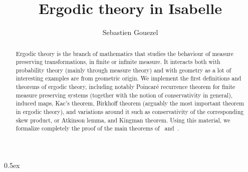 \documentclass[11pt,a4paper]{article}
\begin{document}
\title{Ergodic theory in Isabelle}
\author{Sebastien Gouezel}
\date{}
\maketitle

\begin{abstract}
Ergodic theory is the branch of mathematics that studies the behaviour of
measure preserving transformations, in finite or infinite measure. It
interacts both with probability theory (mainly through measure theory) and
with geometry as a lot of interesting examples are from geometric origin.
We implement the first definitions and theorems of ergodic theory,
including notably Poincar\'e recurrence theorem for finite measure
preserving systems (together with the notion of conservativity in general),
induced maps, Kac's theorem, Birkhoff theorem (arguably the most important
theorem in ergodic theory), and variations around it such as conservativity
of the corresponding skew product, or Atkinson lemma, and Kingman theorem.
Using this material, we formalize completely the proof of the main theorems
of~\cite{gouezel_karlsson} and~\cite{gouezel_normalizing_sequences}.
\end{abstract}

\tableofcontents

\parindent 0pt\parskip 0.5ex





\end{document}
